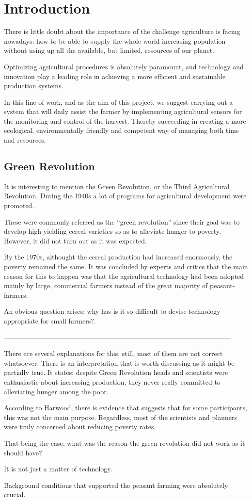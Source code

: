 \chapter{Introduction}\label{cap:introduccion}
There is little doubt about the importance of the challenge agriculture is facing nowadays: how to be able to supply the whole world increasing population without using up all the available, but limited, resources of our planet.

Optimizing agricultural procedures is absolutely paramount, and technology and innovation play a leading role in achieving a more efficient and sustainable production systems.

In this line of work, and as the aim of this project, we suggest carrying out a system that will daily assist the farmer by implementing agricultural sensors for the monitoring and control of the harvest. Thereby succeeding in creating a more ecological, environmentally friendly and competent way of managing both time and resources.


\section{Green Revolution}

It is interesting to mention the Green Revolution, or the Third Agricultural Revolution. During the 1940s a lot of programs for agricultural development were promoted\cite{greenrevolution1}.

These were commonly referred as the ``green revolution'' since their goal was to develop high-yielding cereal varieties so as to alleviate hunger to poverty. However, it did not turn out as it was expected.

By the 1970s, althought the cereal production had increased enormously, the poverty remained the same. It was concluded by experts and critics that the main reason for this to happen was that the agricultural technology had been adopted mainly by large, commercial farmers instead of the great majority of peasant-farmers.

An obvious question arises: why has is it so difficult to devise technology appropriate for small farmers?\cite{greenrevolution2}.

-----------------------------------------------------------------------------------------------------

There are several explanations for this, still, most of them are not correct whatsoever. There is an interpretation that is worth discussing as it might be partially true. It states: despite Green Revolution heads and scientists were enthusiastic about increasing production, they never really committed to alleviating hunger among the poor.

According to Harwood, there is evidence that suggests that for some participants, this was not the main purpose. Regardless, most of the scientists and planners were truly concerned about reducing poverty rates.

That being the case, what was the reason the green revolution did not work as it should have?

It is not just a matter of technology.

Background conditions that supported the peasant farming were absolutely crucial. 
